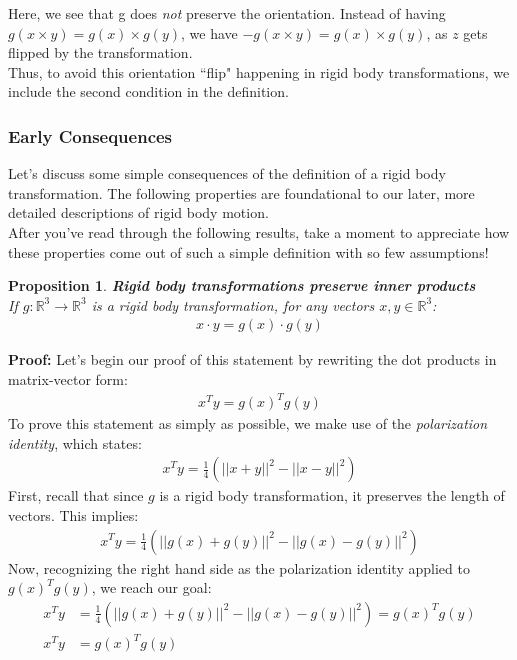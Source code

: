 \documentclass[oneside]{book}
\newtheorem{proposition}{Proposition}
\newenvironment{prop} %
  {\colorlet{shadecolor}{blue!9}\begin{shaded}\begin{proposition}}
  {\end{proposition}\end{shaded}}
\begin{document}
Here, we see that g does \textit{not} preserve the orientation. Instead of having $g(x\times y) = g(x) \times g(y)$, we have $-g(x\times y) = g(x) \times g(y)$, as $z$ gets flipped by the transformation.\\
Thus, to avoid this orientation ``flip" happening in rigid body transformations, we include the second condition in the definition.

\subsubsection{Early Consequences}
Let's discuss some simple consequences of the definition of a rigid body transformation. The following properties are foundational to our later, more detailed descriptions of rigid body motion.\\
After you've read through the following results, take a moment to appreciate how these properties come out of such a simple definition with so few assumptions!
\begin{prop}
\textbf{Rigid body transformations preserve inner products}\\
If $g: \mathbb{R}^3 \to \mathbb{R}^3$ is a rigid body transformation, for any vectors $x, y\in \mathbb{R}^3$:
\begin{align}
    x\cdot y = g(x) \cdot g(y)
\end{align}
\end{prop}\noindent
\textbf{Proof:}
Let's begin our proof of this statement by rewriting the dot products in matrix-vector form:
\begin{align}
    x^Ty = g(x)^Tg(y)
\end{align}
To prove this statement as simply as possible, we make use of the \textit{polarization identity}, which states:
\begin{align}
    x^Ty = \frac{1}{4}(||x + y||^2 - ||x - y||^2)
\end{align}
First, recall that since $g$ is a rigid body transformation, it preserves the length of vectors. This implies:
\begin{align}
    x^Ty = \frac{1}{4}(||g(x) + g(y)||^2 - ||g(x) - g(y)||^2)
\end{align}
Now, recognizing the right hand side as the polarization identity applied to $g(x)^Tg(y)$, we reach our goal:
\begin{align}
    x^Ty &= \frac{1}{4}(||g(x) + g(y)||^2 - ||g(x) - g(y)||^2) = g(x)^Tg(y)\\
    x^Ty &= g(x)^Tg(y)
\end{align}
\end{document}
